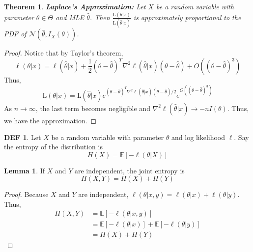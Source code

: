 \documentclass{article}
\newtheorem{theorem}{Theorem}
\theoremstyle{definition}\newtheorem{definition}{DEF}
\theoremstyle{definition}\newtheorem{example}{Ex}
\theoremstyle{lemma}\newtheorem{lemma}{Lemma}
\theoremstyle{corrolary}\newtheorem{corrolary}{Cor}
\begin{document}
\begin{theorem}
\textbf{Laplace's Approximation:}
Let $X$ be a random variable with parameter $\theta \in \Theta$ and MLE $\hat{\theta}$.
Then $\frac{{\mathrm L}(\theta | x)}{{\mathrm L}(\hat{\theta} |x)}$ is approximately proportional to the PDF of $\mathcal{N}(\hat{\theta}, I_X(\theta))$.
\end{theorem}
\begin{proof}
Notice that by Taylor's theorem,
\begin{equation*}
\ell (\theta | x) = \ell(\hat{\theta} | x) + \frac{1}{2} (\theta - \hat{\theta})^T \nabla^2 \ell (\hat{\theta} | x) (\theta - \hat{\theta})  + O((\theta - \hat{\theta})^3)
\end{equation*}
Thus,
\begin{equation*}
{\mathrm L}(\theta | x) = {\mathrm L} (\hat{\theta} | x) e^{(\theta - \hat{\theta})^T \nabla^2 \ell (\hat{\theta} | x) (\theta - \hat{\theta}) / 2} e^{O((\theta - \hat{\theta})^3)}
\end{equation*}
As $n\rightarrow \infty$, the last term becomes negligible and $\nabla^2 \ell (\hat{\theta} | x) \rightarrow -nI(\theta)$.
Thus, we have the approximation.
\end{proof}

\begin{definition}
Let $X$ be a random variable with parameter $\theta$ and log likelihood $\ell$.
Say the entropy of the distribution is
\begin{equation}
H(X) = \mathbb{E}[-\ell (\theta | X)]
\end{equation}
\end{definition}

\begin{lemma}
If $X$ and $Y$ are independent, the joint entropy is
\begin{equation}
H(X,Y)=H(X)+H(Y)
\end{equation}
\end{lemma}
\begin{proof}
Because $X$ and $Y$ are independent, $\ell(\theta | x, y) = \ell(\theta|x) + \ell(\theta|y)$.
Thus,
\begin{align*}
H(X,Y)
&= \mathbb{E}[-\ell(\theta | x,y)] \\
&= \mathbb{E}[-\ell(\theta | x)] + \mathbb{E}[-\ell(\theta|y)] \\
&= H(X) + H(Y)
\end{align*}
\end{proof}
\end{document}

